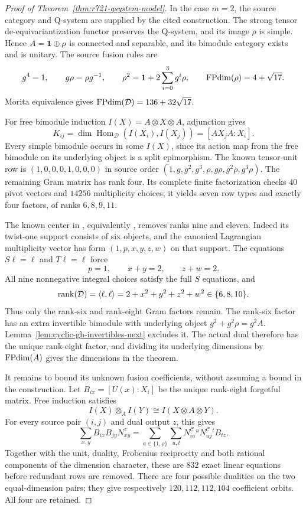 \begin{proof}[Proof of Theorem~\ref{thm:r721-qsystem-model}]
In the case $m=2$, the source category and Q-system are supplied by the
cited construction. The strong tensor de-equivariantization functor
preserves the Q-system, and its image $\rho$ is simple. Hence
$A=\mathbf1\oplus\rho$ is connected and separable, and its bimodule category
exists and is unitary. The source fusion rules are
\[
 g^4=1,\qquad g\rho=\rho g^{-1},\qquad
 \rho^2=\mathbf1+2\sum_{i=0}^3g^i\rho,
 \qquad \operatorname{FPdim}(\rho)=4+\sqrt{17}.
\]
Morita equivalence gives
$\operatorname{FPdim}(\mathcal D)=136+32\sqrt{17}$.

For free bimodule induction $I(X)=A\otimes X\otimes A$, adjunction gives
\[
 K_{ij}=\dim\operatorname{Hom}_{\mathcal D}(I(X_i),I(X_j))
       =[A X_j A:X_i].
\]
Every simple bimodule occurs in some $I(X)$, since its action map from the
free bimodule on its underlying object is a split epimorphism.
The known tensor-unit row is $(1,0,0,0,1,0,0,0)$ in source order
$(1,g,g^2,g^3,\rho,g\rho,g^2\rho,g^3\rho)$.
The remaining Gram matrix has rank four. Its complete finite factorization
checks $40$ pivot vectors and $14256$ multiplicity choices; it yields seven
row types and exactly four factors, of ranks $6,8,9,11$.

The known center in
\cite[Theorem~6.8 and Example~6.10]{GrossmanIzumiCentersNext}, equivalently
\cite[Definition~6.1 and Section~6.1.6]{GrossmanIzumiMetricNext}, removes
ranks nine and eleven. Indeed its twist-one support consists of six objects,
and the canonical Lagrangian multiplicity vector has form
$(1,p,x,y,z,w)$ on that support. The equations $S\ell=\ell$ and
$T\ell=\ell$ force
\[
 p=1,\qquad x+y=2,\qquad z+w=2.
\]
All nine nonnegative integral choices satisfy the full $S$ equations, and
\[
 \operatorname{rank}(\mathcal D)=\langle\ell,\ell\rangle
       =2+x^2+y^2+z^2+w^2\in\{6,8,10\}.
\]
Thus only the rank-six and rank-eight Gram factors remain.
The rank-six factor has an extra invertible bimodule with underlying object
$g^2+g^2\rho=g^2A$. Lemma~\ref{lem:cyclic-gh-invertibles-next} excludes it.
The actual dual therefore has the unique rank-eight factor, and dividing
its underlying dimensions by $\operatorname{FPdim}(A)$ gives the dimensions in the theorem.

It remains to bound its unknown fusion coefficients, without assuming a
bound in the construction. Let $B_{i x}=[U(x):X_i]$ be the unique rank-eight
forgetful matrix. Free induction satisfies
\[
 I(X)\otimes_A I(Y)\cong I(X\otimes A\otimes Y).
\]
For every source pair $(i,j)$ and dual output $z$, this gives
\[
 \sum_{x,y}B_{i x}B_{j y}N_{xy}^{z}
   =\sum_{a\in\{1,\rho\}}\sum_{u,t}
        N^{\mathcal C}_{i a}{}^{u}
        N^{\mathcal C}_{u j}{}^{t} B_{t z}.
\]
Together with the unit, duality, Frobenius reciprocity and both rational
components of the dimension character, these are $832$ exact linear
equations before redundant rows are removed. There are four possible
dualities on the two equal-dimension pairs; they give respectively
$120,112,112,104$ coefficient orbits. All four are retained.


\end{proof}
